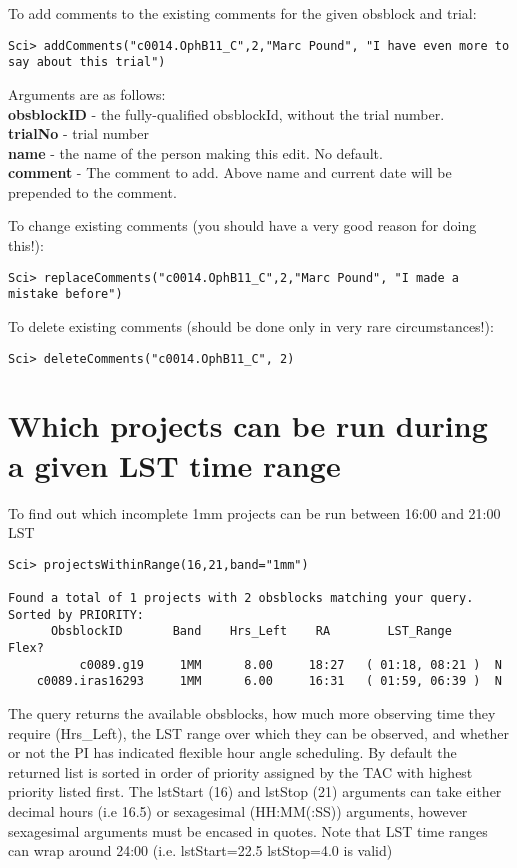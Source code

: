 \documentclass[preprint]{aastex} %
\begin{document}
To add comments to the existing comments for the given obsblock and trial:
\begin{verbatim}
Sci> addComments("c0014.OphB11_C",2,"Marc Pound", "I have even more to say about this trial")
\end{verbatim}
\noindent Arguments are as follows:\\
{\bf obsblockID} - the fully-qualified obsblockId, without the trial number.\\
{\bf trialNo} - trial number\\
{\bf name} - the name of the person making this edit. No default.\\
{\bf comment} - The comment to add.  Above name and current date will be prepended to the comment.  

To change existing comments (you should have a very good reason for doing this!):
\begin{verbatim}
Sci> replaceComments("c0014.OphB11_C",2,"Marc Pound", "I made a mistake before")
\end{verbatim}

To delete existing comments (should be done only in very rare circumstances!):
\begin{verbatim}
Sci> deleteComments("c0014.OphB11_C", 2)
\end{verbatim}


\section{Which projects can be run during a given LST time range}
To find out which incomplete 1mm projects can be run between 16:00 and 21:00 LST
\begin{verbatim}
Sci> projectsWithinRange(16,21,band="1mm")

Found a total of 1 projects with 2 obsblocks matching your query.
Sorted by PRIORITY:
      ObsblockID       Band    Hrs_Left    RA        LST_Range    Flex?
          c0089.g19     1MM      8.00     18:27   ( 01:18, 08:21 )  N
    c0089.iras16293     1MM      6.00     16:31   ( 01:59, 06:39 )  N

\end{verbatim}
\noindent  The query returns the available obsblocks, how much more observing
time they require (Hrs\_Left), the LST range over which they can be observed,
and whether or not the PI has indicated flexible hour angle scheduling.
By default the returned list is sorted in order of priority assigned by
the TAC with highest priority listed first.  
The lstStart (16) and lstStop (21) arguments can take either decimal hours (i.e 16.5) or sexagesimal (HH:MM(:SS)) arguments, however sexagesimal arguments must be encased in quotes. Note that LST time ranges can wrap around 24:00 (i.e. lstStart=22.5 lstStop=4.0 is valid)
\end{document}
